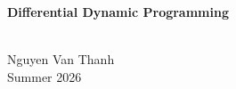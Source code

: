 \documentclass[12pt,a4paper]{article}
\numberwithin{equation}{section}
\begin{document}
\begin{center}
\begin{Large}
    \textbf{Differential Dynamic Programming}
\end{Large}
\\
Nguyen Van Thanh\\
Summer 2026
\end{center}


\end{document}
